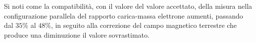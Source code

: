 \documentclass[a4paper,12pt]{article}
\begin{document}
Si noti come la compatibilità, con il valore del valore accettato, della misura nella configurazione parallela del rapporto carica-massa elettrone aumenti, passando dal \(35\%\) al \(48\%\), in seguito alla correzione del campo magnetico terrestre che produce una diminuzione il valore sovrastimato. 
\end{document}
